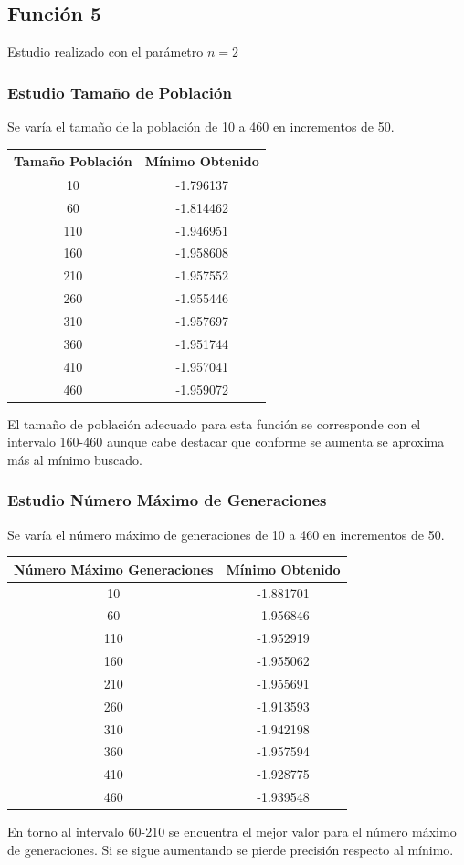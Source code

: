 \documentclass[12pt]{article}
\begin{document}
\subsection{Función 5}
	Estudio realizado con el parámetro $n=2$
\subsubsection*{Estudio Tamaño de Población}
	Se varía el tamaño de la población de 10 a 460 en incrementos de 50.
\begin{table}[H]
\begin{center}
\begin{tabular}{|cc|} \hline
Tamaño Población & Mínimo Obtenido \\  \hline
10  & -1.796137 \\ 
60  & -1.814462 \\ 
110 & -1.946951 \\
160 & -1.958608 \\
210 & -1.957552 \\
260 & -1.955446 \\
310 & -1.957697 \\
360 & -1.951744 \\ 
410 & -1.957041 \\
460 & -1.959072 \\  \hline
\end{tabular}
\end{center}
\end{table}
	El tamaño de población adecuado para esta función se corresponde con el intervalo 160-460 aunque cabe destacar que conforme se aumenta se aproxima más al mínimo buscado.	 

\subsubsection*{Estudio Número Máximo de Generaciones}
	Se varía el número máximo de generaciones de 10 a 460 en incrementos de 50.
\begin{table}[H]
\begin{center}
\begin{tabular}{|cc|} \hline
Número Máximo Generaciones & Mínimo Obtenido \\  \hline
10  & -1.881701 \\ 
60  & -1.956846 \\ 
110 & -1.952919 \\
160 & -1.955062 \\
210 & -1.955691 \\
260 & -1.913593 \\
310 & -1.942198 \\
360 & -1.957594 \\ 
410 & -1.928775 \\
460 & -1.939548 \\  \hline
\end{tabular}
\end{center}
\end{table}
	En torno al intervalo 60-210 se encuentra el mejor valor para el número máximo de generaciones. Si se sigue aumentando se pierde precisión respecto al mínimo.
\end{document}
